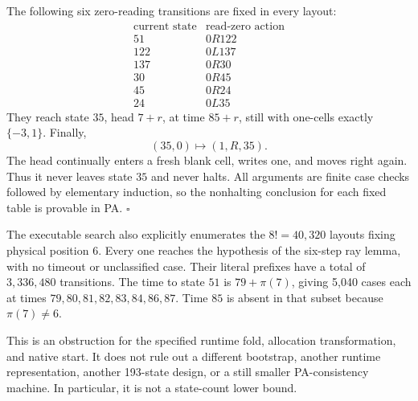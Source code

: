 The following six zero-reading transitions are fixed in every layout:
\[
\begin{array}{c|c}
\text{current state} & \text{read-zero action}\\ \hline
51  & 0R122\\
122 & 0L137\\
137 & 0R30\\
30  & 0R45\\
45  & 0R24\\
24  & 0L35
\end{array}
\]
They reach state \(35\), head \(7+r\), at time \(85+r\), still with
one-cells exactly \(\{-3,1\}\). Finally,
\[
                 (35,0)\mapsto(1,R,35).
\]
The head continually enters a fresh blank cell, writes one, and moves
right again. Thus it never leaves state \(35\) and never halts.
All arguments are finite case checks followed by elementary induction,
so the nonhalting conclusion for each fixed table is provable in PA.
\hfill\(\square\)

The executable search also explicitly enumerates the \(8!=40{,}320\)
layouts fixing physical position \(6\). Every one reaches the
hypothesis of the six-step ray lemma, with no timeout or unclassified
case. Their literal prefixes have a total of \(3{,}336{,}480\) transitions.
The time to state \(51\) is \(79+\pi(7)\), giving 5,040 cases each at
times \(79,80,81,82,83,84,86,87\). Time \(85\) is absent in that subset
because \(\pi(7)\ne6\).

This is an obstruction for the specified runtime fold, allocation
transformation, and native start. It does not rule out a different
bootstrap, another runtime representation, another 193-state design,
or a still smaller PA-consistency machine. In particular, it is not a
state-count lower bound.
